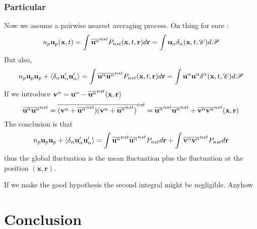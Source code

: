 \documentclass[12pt]{My_preprint}
\begin{document}
\subsubsection*{Particular}
Now we assume a pairwise nearest averaging process. 
On thing for sure : 
\begin{equation*}
    n_p \textbf{u}_p(\textbf{x},t)
    = \int \overline{ \textbf{u}^\alpha}^{nst}  P_{nst}(\textbf{x},t,\textbf{r}) d\textbf{r}
    = \int  \textbf{u}_\alpha \delta_\alpha (\textbf{x},t,\mathscr{C}) d\mathscr{P} 
\end{equation*}
But also, 
\begin{equation*}
    n_p \textbf{u}_p \textbf{u}_p
    + \left<\delta_\alpha \textbf{u}_\alpha' \textbf{u}_\alpha'\right>
    =
    \int \overline{ \textbf{u}^\alpha\textbf{u}^\alpha}^{nst}  P_{nst}(\textbf{x},t,\textbf{r}) d\textbf{r}
    = \int  \textbf{u}^\alpha\textbf{u}^\alpha \delta^\alpha (\textbf{x},t,\mathscr{C}) d\mathscr{P} 
\end{equation*}
If we introduce $\textbf{v}^\alpha = \textbf{u}^\alpha - \overline{\textbf{u}^\alpha}^{nst}(\textbf{x},\textbf{r})$ 
\begin{equation*}
    \overline{ \textbf{u}^\alpha\textbf{u}^\alpha}^{nst}
    = \overline{ (\textbf{v}^\alpha + \overline{\textbf{u}^\alpha}^{nst})(\textbf{v}^\alpha + \overline{\textbf{u}^\alpha}^{nst})}^{nst}
    = \overline{ \textbf{u}^\alpha}^{nst}\overline{\textbf{u}^\alpha}^{nst} + \overline{ \textbf{v}^\alpha \textbf{v}^\alpha }^{nst}(\textbf{x},\textbf{r})
\end{equation*}
The conclusion is that 
\begin{align*}
    n_p \textbf{u}_p \textbf{u}_p
    + \left<\delta_\alpha \textbf{u}_\alpha' \textbf{u}_\alpha'\right>
    =\int \overline{ \textbf{u}^\alpha}^{nst}\overline{\textbf{u}^\alpha}^{nst} P_{nst} d\textbf{r}
    + \int \overline{ \textbf{v}^\alpha \textbf{v}^\alpha }^{nst}  P_{nst} d\textbf{r}\\
\end{align*}
thus the global fluctuation is the mean fluctuation plus the fluctuation at the position $(\textbf{x},\textbf{r})$. 

If we make the  good hypothesis the second integral might be negligible. 
Anyhow 

\section{Conclusion}




\appendix
\end{document}
